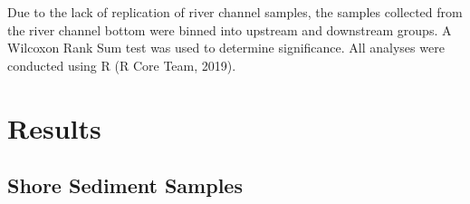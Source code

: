 \documentclass[ms, hidelinks]{uncgdissertationexp}
\theoremstyle{plain}
\theoremstyle{definition}
\theoremstyle{remark}
\begin{document}
Due to the lack of replication of river channel samples, the samples collected from the river channel bottom were binned into upstream and downstream groups. A Wilcoxon Rank Sum test was used to determine significance. All analyses were conducted using R (R Core Team, 2019).

\hypertarget{results}{%
\section{Results}\label{results}}

\hypertarget{shore-sediment-samples}{%
\subsection{Shore Sediment Samples}\label{shore-sediment-samples}}
\end{document}
